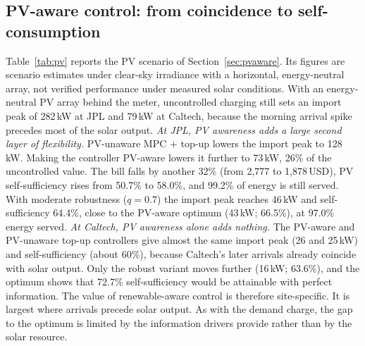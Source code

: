 \subsection{PV-aware control: from coincidence to self-consumption}\label{sec:res:pvaware}
Table~\ref{tab:pv} reports the PV scenario of Section~\ref{sec:pvaware}. Its figures are scenario estimates under clear-sky irradiance with a horizontal, energy-neutral array, not verified performance under measured solar conditions. With an energy-neutral PV array behind the meter, uncontrolled charging still sets an import peak of 282\,kW at JPL and 79\,kW at Caltech, because the morning arrival spike precedes most of the solar output.
\emph{At JPL, PV awareness adds a large second layer of flexibility.} PV-unaware MPC + top-up lowers the import peak to 128\,kW. Making the controller PV-aware lowers it further to 73\,kW, 26\% of the uncontrolled value. The bill falls by another 32\% (from 2,777 to 1,878\,USD), PV self-sufficiency rises from 50.7\% to 58.0\%, and 99.2\% of energy is still served. With moderate robustness ($q=0.7$) the import peak reaches 46\,kW and self-sufficiency 64.4\%, close to the PV-aware optimum (43\,kW; 66.5\%), at 97.0\% energy served. \emph{At Caltech, PV awareness alone adds nothing.} The PV-aware and PV-unaware top-up controllers give almost the same import peak (26 and 25\,kW) and self-sufficiency (about 60\%), because Caltech's later arrivals already coincide with solar output. Only the robust variant moves further (16\,kW; 63.6\%), and the optimum shows that 72.7\% self-sufficiency would be attainable with perfect information.
The value of renewable-aware control is therefore site-specific. It is largest where arrivals precede solar output. As with the demand charge, the gap to the optimum is limited by the information drivers provide rather than by the solar resource.



